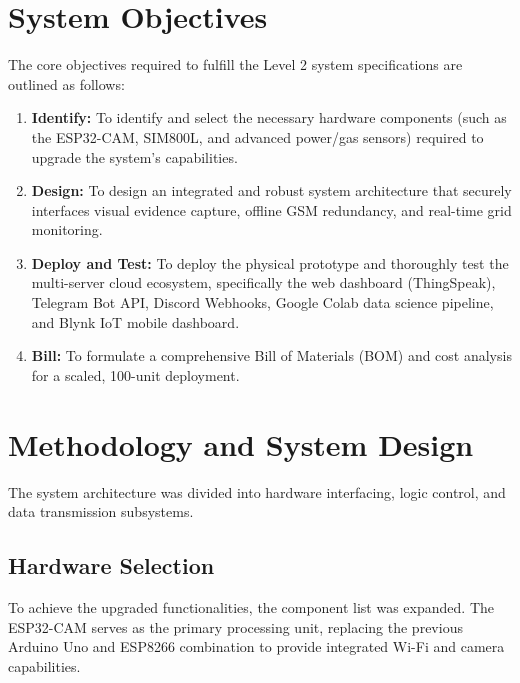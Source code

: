 \documentclass[12pt,a4paper]{article}
\begin{document}
\section{System Objectives}
The core objectives required to fulfill the Level 2 system specifications are outlined as follows:
\begin{enumerate}
    \item \textbf{Identify:} To identify and select the necessary hardware components (such as the ESP32-CAM, SIM800L, and advanced power/gas sensors) required to upgrade the system's capabilities.
    \item \textbf{Design:} To design an integrated and robust system architecture that securely interfaces visual evidence capture, offline GSM redundancy, and real-time grid monitoring.
    \item \textbf{Deploy and Test:} To deploy the physical prototype and thoroughly test the multi-server cloud ecosystem, specifically the web dashboard (ThingSpeak), Telegram Bot API, Discord Webhooks, Google Colab data science pipeline, and Blynk IoT mobile dashboard.
    \item \textbf{Bill:} To formulate a comprehensive Bill of Materials (BOM) and cost analysis for a scaled, 100-unit deployment.
\end{enumerate}

\section{Methodology and System Design}
The system architecture was divided into hardware interfacing, logic control, and data transmission subsystems. 

\subsection{Hardware Selection}
To achieve the upgraded functionalities, the component list was expanded. The ESP32-CAM serves as the primary processing unit, replacing the previous Arduino Uno and ESP8266 combination to provide integrated Wi-Fi and camera capabilities.
\end{document}
